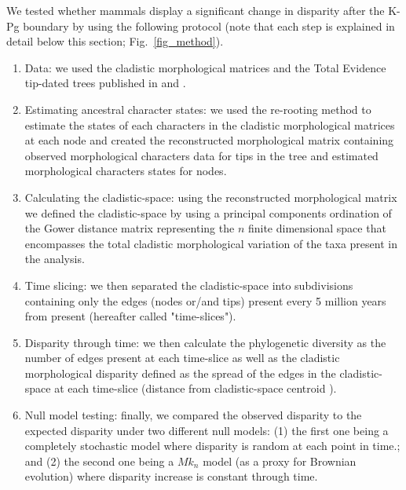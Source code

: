 \documentclass[12pt,letterpaper]{article}
\begin{document}
We tested whether mammals display a significant change in disparity after the K-Pg boundary by using the following protocol (note that each step is explained in detail below this section; Fig.~\ref{fig_method}).
\begin{enumerate}
\item{Data: we used the cladistic morphological matrices and the Total Evidence tip-dated trees published in \cite{MEE3:MEE312084} and \cite{beckancient2014}.} \\
\item{Estimating ancestral character states: we used the \cite{Yang01121995} re-rooting method to estimate the states of each characters in the cladistic morphological matrices at each node and created the reconstructed morphological matrix containing observed morphological characters data for tips in the tree and estimated morphological characters states for nodes.}\\
\item{Calculating the cladistic-space: using the reconstructed morphological matrix we defined the cladistic-space by using a principal components ordination of the Gower distance matrix \citep{Gower71} representing the $n$ finite dimensional space that encompasses the total cladistic morphological variation of the taxa present in the analysis.} \\
\item{Time slicing: we then separated the cladistic-space into subdivisions containing only the edges (nodes or/and tips) present every 5 million years from present (hereafter called "time-slices").} \\
\item{Disparity through time: we then calculate the phylogenetic diversity as the number of edges present at each time-slice as well as the cladistic morphological disparity defined as the spread of the edges in the cladistic-space at each time-slice (distance from cladistic-space centroid \citep{finlay2015morphological}).} \\
\item{Null model testing: finally, we compared the observed disparity to the expected disparity under two different null models: (1) the first one being a completely stochastic model where disparity is random at each point in time.; and (2) the second one being a $Mk_n$ model (as a proxy for Brownian evolution) where disparity increase is constant through time.} \\
\end{enumerate}
\end{document}
